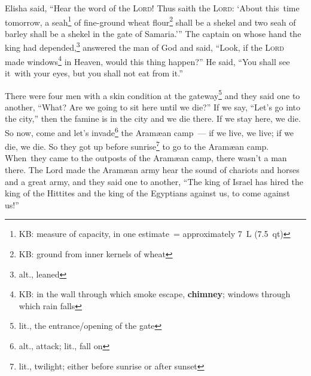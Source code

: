 
\begin{inparaenum}
     Elisha said, ``Hear the word of the \textsc{Lord}! Thus saith the \textsc{Lord}: `About this\understood\ time tomorrow, a seah\footnote{KB: measure of capacity, in one estimate~= approximately 7~L (7.5~qt)} of fine-ground wheat flour\footnote{KB: ground from inner kernels of wheat} shall be a shekel and two seah of barley shall be a shekel in the gate of Samaria.'\thinspace''%
     The captain on whose hand the king had depended,\footnote{alt., leaned} answered the man of God and said, ``Look, if the \textsc{Lord} made windows\footnote{KB: in the wall through which smoke escape, \textbf{chimney}; windows through which rain falls} in Heaven, would this thing happen?'' He said, ``You shall see it\understood\ with your eyes, but you shall not eat from it.''%
    
     There were four men with a skin condition at the gateway\footnote{lit., the entrance/opening of the gate} and they said one to another, ``What? Are we going to sit here until we die?''%
     If we say, ``Let's go into the city,'' then the famine is in the city and we die there. If we stay here, we die. So now, come and let's invade\footnote{alt., attack; lit., fall on} the Aram\ae{}an camp~--- if we live, we live; if we die, we die.%
     So they got up before sunrise\footnote{lit., twilight; either before sunrise or after sunset} to go to the Aram\ae{}an camp. When\understood\ they came to the outposts of the Aram\ae{}an camp, there wasn't a man there.%
     The Lord made the Aram\ae{}an army hear the sound of chariots and horses and a great army, and they said one to another, ``The king of Israel has hired the king of the Hittites and the king of the Egyptians against us, to come against us!''%
\end{inparaenum}
